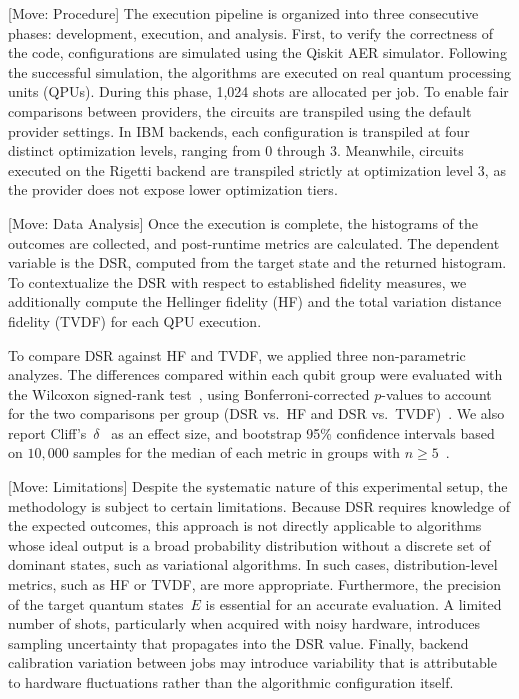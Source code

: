 \documentclass{article}
\begin{document}
[Move: Procedure] The execution pipeline is organized into three consecutive phases: development, execution, and analysis. First, to verify the correctness of the code, configurations are simulated using the Qiskit AER simulator. Following the successful simulation, the algorithms are executed on real quantum processing units (QPUs). During this phase, 1,024 shots are allocated per job. To enable fair comparisons between providers, the circuits are transpiled using the default provider settings. In IBM backends, each configuration is transpiled at four distinct optimization levels, ranging from 0 through 3. Meanwhile, circuits executed on the Rigetti backend are transpiled strictly at optimization level 3, as the provider does not expose lower optimization tiers.

[Move: Data Analysis] Once the execution is complete, the histograms of the outcomes are collected, and post-runtime metrics are calculated. The dependent variable is the DSR, computed from the target state and the returned histogram. To contextualize the DSR with respect to established fidelity measures, we additionally compute the Hellinger fidelity (HF) and the total variation distance fidelity (TVDF) for each QPU execution.

To compare DSR against HF and TVDF, we applied three non-parametric analyzes. The differences compared within each qubit group were evaluated with the Wilcoxon signed-rank test~\cite{Wilcoxon1992_1992}, using Bonferroni-corrected $p$-values to account for the two comparisons per group (DSR vs.\ HF and DSR vs.\ TVDF)~\cite{McEwan_2017_2017}. We also report Cliff's~$\delta$~\cite{cliffDominanceStatisticsOrdinal_1993} as an effect size, and bootstrap 95\% confidence intervals based on $10{,}000$ samples for the median of each metric in groups with $n \geq 5$~\cite{efronIntroductionBootstrap_1994}.

[Move: Limitations] Despite the systematic nature of this experimental setup, the methodology is subject to certain limitations. Because DSR requires knowledge of the expected outcomes, this approach is not directly applicable to algorithms whose ideal output is a broad probability distribution without a discrete set of dominant states, such as variational algorithms. In such cases, distribution-level metrics, such as HF or TVDF, are more appropriate. Furthermore, the precision of the target quantum states~$E$ is essential for an accurate evaluation. A limited number of shots, particularly when acquired with noisy hardware, introduces sampling uncertainty that propagates into the DSR value. Finally, backend calibration variation between jobs may introduce variability that is attributable to hardware fluctuations rather than the algorithmic configuration itself.

\printbibliography
\end{document}
